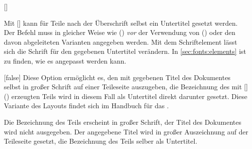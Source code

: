 \begin{Declaration*}{}
\begin{Declaration*}{}
\begin{Declaration*}{}
\begin{Declaration}[v2.06]{[]}
\begin{Declaration}[v2.06]{}
\printdeclarationlist%
%
%
%
%
Mit [] kann für Teile nach der 
Überschrift selbst ein Untertitel gesetzt werden. Der Befehl muss in gleicher 
Weise wie () \emph{vor} der 
Verwendung von () oder den davon abgeleiteten 
Varianten angegeben werden. Mit dem Schriftelement  lässt 
sich die Schrift für den gegebenen Untertitel verändern. In 
\autoref{sec:fonts:elements} ist zu finden, wie es angepasst werden kann.
\end{Declaration}
\end{Declaration}

\begin{Declaration}{}[false]%
\printdeclarationlist%
%
%
%
Diese Option ermöglicht es, den mit  gegebenen Titel des 
Dokumentes selbst in großer Schrift auf einer Teileseite auszugeben, die 
Bezeichnung des mit 
[]() erzeugten Teils 
wird in diesem Fall als Untertitel direkt darunter gesetzt. Diese 
Variante des Layouts findet sich im Handbuch für das \TUDCD. \notudscrartcl
%
\begin{values}{}
\itemfalse
  Die Bezeichnung des Teils erscheint in großer Schrift, der Titel des 
  Dokumentes wird nicht ausgegeben.
\itemtrue*
  Der angegebene Titel wird in großer Auszeichnung auf der Teileseite gesetzt,
  die Bezeichnung des Teils selber als Untertitel.
\end{values}
\end{Declaration}




\end{Declaration*}
\end{Declaration*}
\end{Declaration*}
